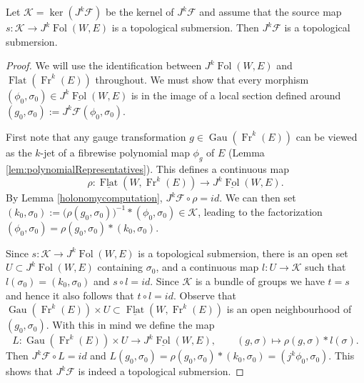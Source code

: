 \documentclass[10pt]{amsart}
\newcommand{\F}{{\mathcal{F}}}
\newcommand{\Kcal}{{\mathcal{K}}}
\newcommand{\FolCat}{{\underline{\operatorname{Fol}}}}
\newcommand{\FolObj}{{\operatorname{Fol}}}
\newcommand{\FlatCat}{{\underline{\operatorname{Flat}}}}
\newcommand{\FlatObj}{{\operatorname{Flat}}}
\newcommand{\Fr}{{\operatorname{Fr}}}
\DeclareMathOperator{\Gau}{Gau}
\numberwithin{theoremalpha}{section}
\numberwithin{equation}{section}
\numberwithin{definition}{section}
\numberwithin{theorem}{section}
\numberwithin{proposition}{section}
\numberwithin{lemma}{section}
\numberwithin{example}{section}
\numberwithin{remark}{section}
\numberwithin{corollary}{section}
\numberwithin{question}{section}
\numberwithin{problem}{section}
\numberwithin{assumption}{section}
\theoremstyle{named}
\numberwithin{equation}{section}
\begin{document}
\begin{lemma}
Let $\Kcal = \ker(J^k\F)$ be the kernel of $J^k\F$ and assume that the source map $s: \Kcal \to J^{k}\FolObj(W,E)$ is a topological submersion. Then $J^k\F$ is a topological submersion. 
\end{lemma}
\begin{proof}
We will use the identification between $J^{k}\FolObj(W,E)$ and $\FlatObj(\Fr^k(E))$ throughout. We must show that every morphism $(\phi_0, \sigma_0) \in J^{k}\FolCat(W,E)$ is in the image of a local section defined around $(g_{0}, \sigma_{0}) := J^k\F(\phi_{0}, \sigma_{0})$.

First note that any gauge transformation $g \in \Gau(\Fr^k(E))$ can be viewed as the $k$-jet of a fibrewise polynomial map $\phi_{g}$ of $E$ (Lemma \ref{lem:polynomialRepresentatives}). This defines a continuous map
\[ \rho: \FlatCat(W, \Fr^{k}(E)) \to J^{k}\FolCat(W,E). \]
By Lemma \ref{holonomycomputation}, $J^k\F \circ \rho = id$. We can then set $(k_0, \sigma_0) := \big( \rho(g_0, \sigma_0) \big)^{-1} \ast (\phi_0, \sigma_0) \in \mathcal{K}$, leading to the factorization $(\phi_0, \sigma_0) = \rho(g_0, \sigma_0) \ast (k_0, \sigma_0)$.

Since $s : \mathcal{K} \to J^{k}\FolObj(W,E)$ is a topological submersion, there is an open set $U \subset J^k\FolObj(W,E)$ containing $\sigma_{0}$, and a continuous map $l : U \to \mathcal{K}$ such that $l(\sigma_{0}) = (k_{0}, \sigma_{0})$ and $s \circ l = id$. Since $\mathcal{K}$ is a bundle of groups we have $t = s$ and hence it also follows that $t \circ l = id$. Observe that $\Gau(\Fr^k(E)) \times U \subset \FlatCat(W, \Fr^{k}(E)) $ is an open neighbourhood of $(g_{0}, \sigma_{0})$. With this in mind we define the map 
\[
L : \Gau(\Fr^k(E)) \times U \to  J^{k}\FolCat(W,E), \qquad (g, \sigma) \mapsto \rho(g, \sigma) \ast l(\sigma). 
\]
Then $J^k\F \circ L = id$ and $L(g_{0}, \sigma_{0}) = \rho(g_0, \sigma_0) \ast (k_0, \sigma_0) = (j^k\phi_0, \sigma_0) $. This shows that $J^k\F$ is indeed a topological submersion.
\end{proof}
\end{document}
